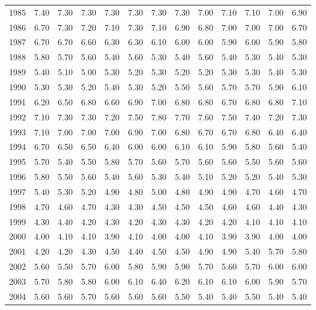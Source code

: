 \begin{longtable}{rrrrrrrrrrrrr}
  1985 & 7.40 & 7.30 & 7.30 & 7.30 & 7.30 & 7.30 & 7.30 & 7.00 & 7.10 & 7.10 & 7.00 & 6.90 \\ 
  1986 & 6.70 & 7.30 & 7.20 & 7.10 & 7.30 & 7.10 & 6.90 & 6.80 & 7.00 & 7.00 & 7.00 & 6.70 \\ 
  1987 & 6.70 & 6.70 & 6.60 & 6.30 & 6.30 & 6.10 & 6.00 & 6.00 & 5.90 & 6.00 & 5.90 & 5.80 \\ 
  1988 & 5.80 & 5.70 & 5.60 & 5.40 & 5.60 & 5.30 & 5.40 & 5.60 & 5.40 & 5.30 & 5.40 & 5.30 \\ 
  1989 & 5.40 & 5.10 & 5.00 & 5.30 & 5.20 & 5.30 & 5.20 & 5.20 & 5.30 & 5.30 & 5.40 & 5.30 \\ 
  1990 & 5.30 & 5.30 & 5.20 & 5.40 & 5.30 & 5.20 & 5.50 & 5.60 & 5.70 & 5.70 & 5.90 & 6.10 \\ 
  1991 & 6.20 & 6.50 & 6.80 & 6.60 & 6.90 & 7.00 & 6.80 & 6.80 & 6.70 & 6.80 & 6.80 & 7.10 \\ 
  1992 & 7.10 & 7.30 & 7.30 & 7.20 & 7.50 & 7.80 & 7.70 & 7.60 & 7.50 & 7.40 & 7.20 & 7.30 \\ 
  1993 & 7.10 & 7.00 & 7.00 & 7.00 & 6.90 & 7.00 & 6.80 & 6.70 & 6.70 & 6.80 & 6.40 & 6.40 \\ 
  1994 & 6.70 & 6.50 & 6.50 & 6.40 & 6.00 & 6.00 & 6.10 & 6.10 & 5.90 & 5.80 & 5.60 & 5.40 \\ 
  1995 & 5.70 & 5.40 & 5.50 & 5.80 & 5.70 & 5.60 & 5.70 & 5.60 & 5.60 & 5.50 & 5.60 & 5.60 \\ 
  1996 & 5.80 & 5.50 & 5.60 & 5.40 & 5.60 & 5.30 & 5.40 & 5.10 & 5.20 & 5.20 & 5.40 & 5.30 \\ 
  1997 & 5.40 & 5.30 & 5.20 & 4.90 & 4.80 & 5.00 & 4.80 & 4.90 & 4.90 & 4.70 & 4.60 & 4.70 \\ 
  1998 & 4.70 & 4.60 & 4.70 & 4.30 & 4.30 & 4.50 & 4.50 & 4.50 & 4.60 & 4.60 & 4.40 & 4.30 \\ 
  1999 & 4.30 & 4.40 & 4.20 & 4.30 & 4.20 & 4.30 & 4.30 & 4.20 & 4.20 & 4.10 & 4.10 & 4.10 \\ 
  2000 & 4.00 & 4.10 & 4.10 & 3.90 & 4.10 & 4.00 & 4.00 & 4.10 & 3.90 & 3.90 & 4.00 & 4.00 \\ 
  2001 & 4.20 & 4.20 & 4.30 & 4.50 & 4.40 & 4.50 & 4.50 & 4.90 & 4.90 & 5.40 & 5.70 & 5.80 \\ 
  2002 & 5.60 & 5.50 & 5.70 & 6.00 & 5.80 & 5.90 & 5.90 & 5.70 & 5.60 & 5.70 & 6.00 & 6.00 \\ 
  2003 & 5.70 & 5.80 & 5.80 & 6.00 & 6.10 & 6.40 & 6.20 & 6.10 & 6.10 & 6.00 & 5.90 & 5.70 \\ 
  2004 & 5.60 & 5.60 & 5.70 & 5.60 & 5.60 & 5.60 & 5.50 & 5.40 & 5.40 & 5.50 & 5.40 & 5.40 \\ 

\end{longtable}
